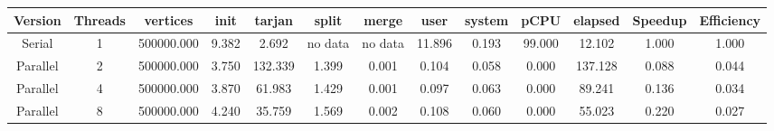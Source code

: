 \begin{tabular}{|c|c|c|c|c|c|c|c|c|c|c|c|c|}
\toprule
 Version &  Threads &   vertices &  init &  tarjan &   split &   merge &   user &  system &   pCPU &  elapsed &  Speedup &  Efficiency \\
\midrule
  Serial &        1 & 500000.000 & 9.382 &   2.692 & no data & no data & 11.896 &   0.193 & 99.000 &   12.102 &    1.000 &       1.000 \\
Parallel &        2 & 500000.000 & 3.750 & 132.339 &   1.399 &   0.001 &  0.104 &   0.058 &  0.000 &  137.128 &    0.088 &       0.044 \\
Parallel &        4 & 500000.000 & 3.870 &  61.983 &   1.429 &   0.001 &  0.097 &   0.063 &  0.000 &   89.241 &    0.136 &       0.034 \\
Parallel &        8 & 500000.000 & 4.240 &  35.759 &   1.569 &   0.002 &  0.108 &   0.060 &  0.000 &   55.023 &    0.220 &       0.027 \\
\bottomrule
\end{tabular}

